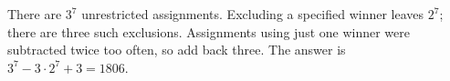 There are $3^7$ unrestricted assignments. Excluding a specified winner leaves $2^7$; there are three such exclusions. Assignments using just one winner were subtracted twice too often, so add back three. The answer is $\boxed{3^7-3\cdot2^7+3=1806}$.
